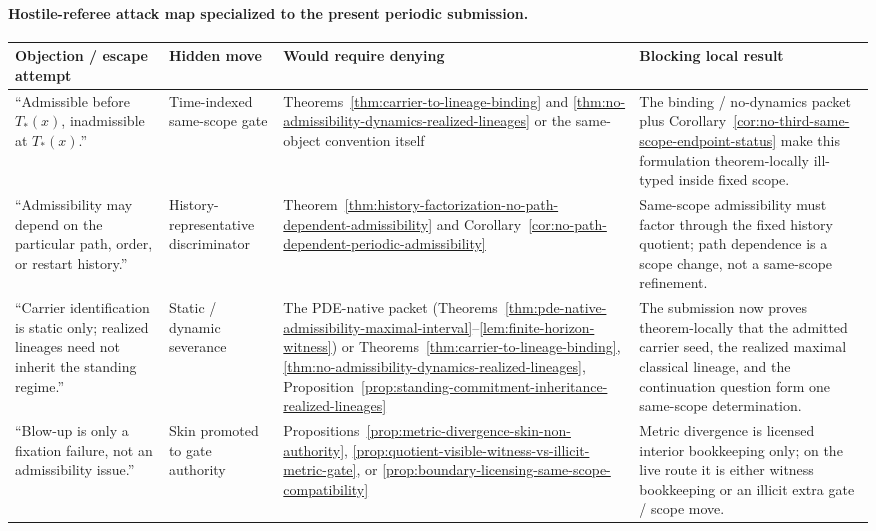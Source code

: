 \paragraph{Hostile-referee attack map specialized to the present periodic submission.}
\begin{center}
\footnotesize
\renewcommand{\arraystretch}{1.14}
\setlength{\tabcolsep}{4pt}
\begin{tabularx}{0.98\textwidth}{@{}L{0.24\textwidth}L{0.17\textwidth}L{0.20\textwidth}Y@{}}
\toprule
\textbf{Objection / escape attempt} & \textbf{Hidden move} & \textbf{Would require denying} & \textbf{Blocking local result}\\
\midrule
``Admissible before $T_*(x)$, inadmissible at $T_*(x)$.'' & Time-indexed same-scope gate & Theorems~\ref{thm:carrier-to-lineage-binding} and \ref{thm:no-admissibility-dynamics-realized-lineages} or the same-object convention itself & The binding / no-dynamics packet plus Corollary~\ref{cor:no-third-same-scope-endpoint-status} make this formulation theorem-locally ill-typed inside fixed scope.\\
``Admissibility may depend on the particular path, order, or restart history.'' & History-representative discriminator & Theorem~\ref{thm:history-factorization-no-path-dependent-admissibility} and Corollary~\ref{cor:no-path-dependent-periodic-admissibility} & Same-scope admissibility must factor through the fixed history quotient; path dependence is a scope change, not a same-scope refinement.\\
``Carrier identification is static only; realized lineages need not inherit the standing regime.'' & Static / dynamic severance & The PDE-native packet (Theorems~\ref{thm:pde-native-admissibility-maximal-interval}--\ref{lem:finite-horizon-witness}) or Theorems~\ref{thm:carrier-to-lineage-binding}, \ref{thm:no-admissibility-dynamics-realized-lineages}, Proposition~\ref{prop:standing-commitment-inheritance-realized-lineages} & The submission now proves theorem-locally that the admitted carrier seed, the realized maximal classical lineage, and the continuation question form one same-scope determination.\\
``Blow-up is only a fixation failure, not an admissibility issue.'' & Skin promoted to gate authority & Propositions~\ref{prop:metric-divergence-skin-non-authority}, \ref{prop:quotient-visible-witness-vs-illicit-metric-gate}, or \ref{prop:boundary-licensing-same-scope-compatibility} & Metric divergence is licensed interior bookkeeping only; on the live route it is either witness bookkeeping or an illicit extra gate / scope move.\\

\end{tabularx}
\end{center}
